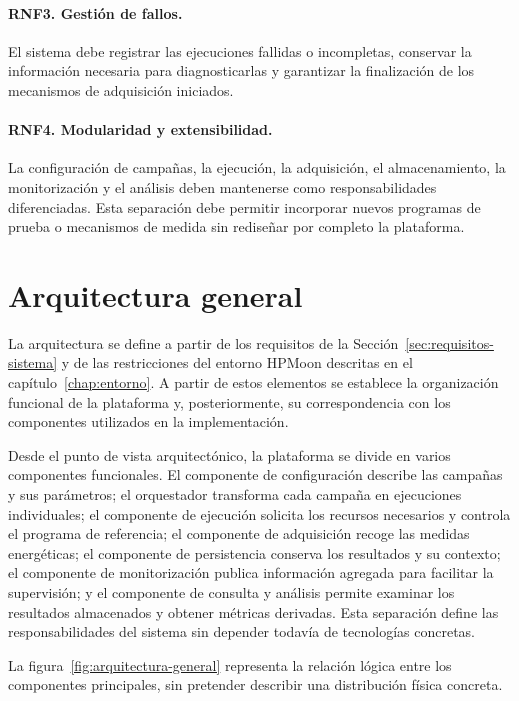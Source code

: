 \paragraph{RNF3. Gestión de fallos.}
El sistema debe registrar las ejecuciones fallidas o incompletas, conservar la información necesaria para diagnosticarlas y garantizar la finalización de los mecanismos de adquisición iniciados.

\paragraph{RNF4. Modularidad y extensibilidad.}
La configuración de campañas, la ejecución, la adquisición, el almacenamiento, la monitorización y el análisis deben mantenerse como responsabilidades diferenciadas. Esta separación debe permitir incorporar nuevos programas de prueba o mecanismos de medida sin rediseñar por completo la plataforma.

\section{Arquitectura general}
\label{sec:arquitectura-implementacion}

La arquitectura se define a partir de los requisitos de la Sección~\ref{sec:requisitos-sistema} y de las restricciones del entorno HPMoon descritas en el capítulo~\ref{chap:entorno}. A partir de estos elementos se establece la organización funcional de la plataforma y, posteriormente, su correspondencia con los componentes utilizados en la implementación.

Desde el punto de vista arquitectónico, la plataforma se divide en varios componentes funcionales. El componente de configuración describe las campañas y sus parámetros; el orquestador transforma cada campaña en ejecuciones individuales; el componente de ejecución solicita los recursos necesarios y controla el programa de referencia; el componente de adquisición recoge las medidas energéticas; el componente de persistencia conserva los resultados y su contexto; el componente de monitorización publica información agregada para facilitar la supervisión; y el componente de consulta y análisis permite examinar los resultados almacenados y obtener métricas derivadas. Esta separación define las responsabilidades del sistema sin depender todavía de tecnologías concretas.

La figura~\ref{fig:arquitectura-general} representa la relación lógica entre los componentes principales, sin pretender describir una distribución física concreta.


